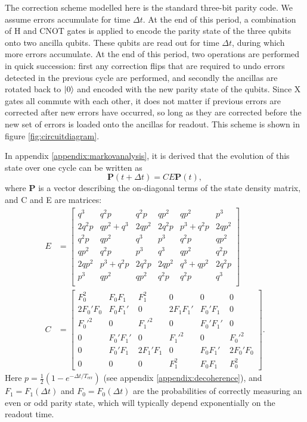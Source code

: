 \documentclass{report}
\begin{document}
The correction scheme modelled here is the standard three-bit parity code. We assume errors accumulate for time $\Delta t$. At the end of this period, a combination of H and CNOT gates is applied to encode the parity state of the three qubits onto two ancilla qubits. These qubits are read out for time $\Delta t$, during which more errors accumulate. At the end of this period, two operations are performed in quick succession: first any correction flips that are required to undo errors detected in the previous cycle are performed, and secondly the ancillas are rotated back to $\ket{0}$ and encoded with the new parity state of the qubits. Since X gates all commute with each other, it does not matter if previous errors are corrected after new errors have occurred, so long as they are corrected before the new set of errors is loaded onto the ancillas for readout. This scheme is shown in figure \ref{fig:circuitdiagram}.

In appendix \ref{appendix:markovanalysis}, it is derived that the evolution of this state over one cycle can be written as 
\begin{equation*}
    \mathbf{P}(t + \Delta t) = CE\mathbf{P}(t),
\end{equation*} where $\mathbf{P}$ is a vector describing the on-diagonal terms of the state density matrix, and C and E are matrices:
\begin{align*}
    E &=     
    \begin{bmatrix}
        q^3& q^2p& q^2p& qp^2& qp^2& p^3 \\
        2 q^2p& qp^2 + q^3& 2 qp^2& 2 q^2p& p^3 + q^2p& 2 qp^2\\
        q^2p& qp^2& q^3& p^3& q^2p& qp^2\\
        qp^2& q^2p& p^3& q^3& qp^2& q^2p\\
        2 qp^2& p^3 + q^2p& 2 q^2p& 2 qp^2& q^3 + qp^2& 2 q^2p\\
        p^3& qp^2& qp^2& q^2p& q^2p& q^3\\
    \end{bmatrix}\\
    C &= 
    \begin{bmatrix}
        F_0^2 & F_0 F_1 & F_1^2 & 0 & 0 & 0 \\
        2F_0'F_0 & F_0 F_1' & 0 & 2F_1 F_1' & F_0' F_1 & 0\\
        F_0'^2 & 0 & F_1'^2 & 0 & F_0' F_1' & 0 \\
        0 & F_0' F_1' & 0 & F_1'^2 & 0 &F_0'^2 \\
        0 &F_0' F_1 & 2F_1' F_1&0&F_0F_1'&2F_0'F_0 \\
        0&0&0& F_1^2 &F_0 F_1 & F_0^2
    \end{bmatrix}.
\end{align*} Here $p = \frac{1}{2}(1-e^{-\Delta t /T_{\text{err}}})$ (see appendix \ref{appendix:decoherence}), and $F_1 = F_1(\Delta t)$ and $F_0 = F_0(\Delta t)$ are the probabilities of correctly measuring an even or odd parity state, which will typically depend exponentially on the readout time.
\end{document}
